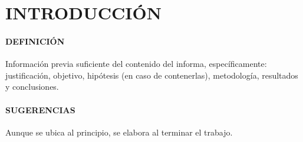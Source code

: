 \section{INTRODUCCIÓN}

\paragraph{DEFINICIÓN}
Información previa suficiente del contenido del informa, específicamente: justificación, objetivo, hipótesis (en caso de contenerlas), metodología, resultados y conclusiones.

\paragraph{SUGERENCIAS}
Aunque se ubica al principio, se elabora al terminar el trabajo.


